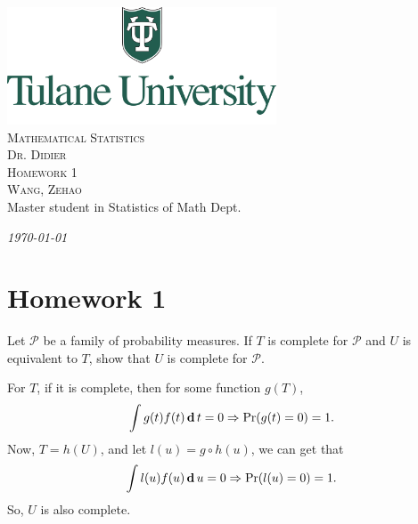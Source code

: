 \documentclass[12pt]{article}
\newcommand{\CN}{Mathematical Statistics}
\newcommand{\Ti}{Homework 1}
\newcommand{\Pf}{Dr. Didier}
\newcommand{\FN}{Zehao}
\newcommand{\LN}{Wang}
\begin{document}
\begin{titlepage}
    \begin{center}    
    \includegraphics[width=0.6\textwidth]{Tulane.png}\\[1cm]    
    
    \textsc{\Huge \CN}\\[0.5cm]
    \textsc{\large \Pf}\\[1.0cm]
    
    \textsc{\LARGE \Ti}\\[0.5cm]
    \textsc{\large \LN, \FN}\\
    {Master student in Statistics of Math Dept.}
    
    
    \vfill
    
    {\Large \emph{\today}}
    
    \end{center}
\end{titlepage}
    
    \setcounter{section}{1}    

    \section*{\Ti}

    \begin{exercise}
        Let \(\mathcal{P}\) be a family of probability measures. If \(T\) is complete for \(\mathcal{P}\) and \(U\) is equivalent to \(T\), show that \(U\) is complete for \(\mathcal{P}\). 
    \end{exercise}
    
    \begin{solution}
        For $T$, if it is complete, then for some function $g(T)$, 
        \[
            \int g(t)f(t)\,\mathbf{d}\, t=0 \Rightarrow \Pr(g(t)=0)=1. 
        \]
        Now, $T=h(U)$, and let $l(u)=g\circ h(u)$, we can get that 
        \[
            \int l(u)f(u)\,\mathbf{d}\, u=0 \Rightarrow \Pr(l(u)=0)=1. 
        \]
        So, $U$ is also complete. 
    \end{solution}
    
\end{document}
